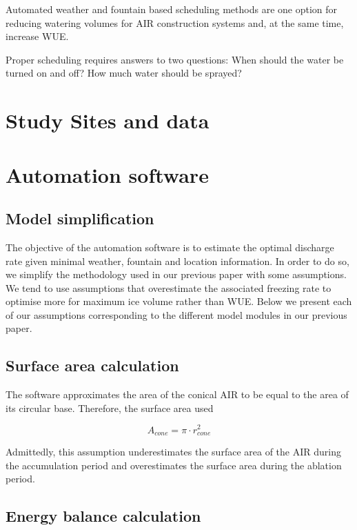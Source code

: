 \documentclass[utf8]{frontiersSCNS}
\begin{document}
Automated weather and fountain based scheduling methods are one option for reducing watering volumes for AIR
construction systems and, at the same time, increase WUE.

Proper scheduling requires answers to two questions: When should the water be turned on and off? How much water
should be sprayed?

\section{Study Sites and data}

\section{Automation software}
\subsection{Model simplification}

The objective of the automation software is to estimate the optimal discharge rate given minimal weather,
fountain and location information. In order to do so, we simplify the methodology used in our previous paper
with some assumptions. We tend to use assumptions that overestimate the associated freezing rate to optimise
more for maximum ice volume rather than WUE. Below we present each of our assumptions corresponding to the
different model modules in our previous paper.

\subsection{Surface area calculation} \label{sec:shape}

The software approximates the area of the conical AIR to be equal to the area of its circular base. Therefore,
the surface area used

\begin{equation} A_{cone} =\pi \cdot r_{cone}^2 \label{eq:Area} \end{equation}

Admittedly, this assumption underestimates the surface area of the AIR during the accumulation period and
overestimates the surface area during the ablation period.  

\subsection{Energy balance calculation} \label{sec:energy}
\end{document}
